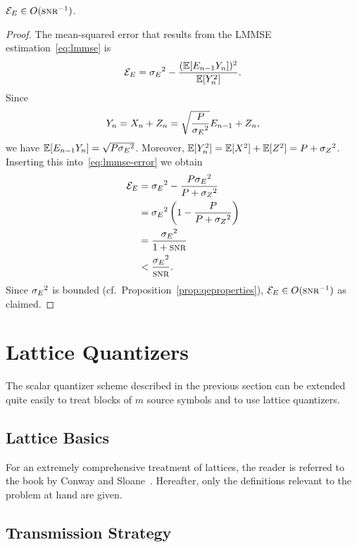\begin{lemma}
  \label{lem:eedecay}
  $\Ee \in O(\snr^{-1})$. 
\end{lemma}
\begin{proof}
  The mean-squared error that results from the LMMSE estimation~\eqref{eq:lmmse}
  is
  \begin{equation}
    \label{eq:lmmse-error}
    {{\mathcal{E}}_E} = {{\sigma_E}^2} - \frac{(\mathbb{E}[E_{n-1}
    Y_n])^2}{\mathbb{E}[Y_n^2]}. 
  \end{equation}
  Since
  \begin{equation*}
    Y_n = X_n + Z_n = \sqrt{\frac{P}{{{\sigma_E}^2}}} E_{n-1} + Z_n,
  \end{equation*}
  we have $\mathbb{E}[E_{n-1}Y_n] = \sqrt{P{{\sigma_E}^2}}$. Moreover, $\mathbb{E}[Y_n^2] = \mathbb{E}[X^2] +
  \mathbb{E}[Z^2] = P+{{\sigma_Z}^2}$.  Inserting this into~\eqref{eq:lmmse-error} we obtain
  \begin{align*}
    \Ee &= \seq - \frac{P \seq}{P + \szq} \\
    &= \seq \left( 1 - \frac{P}{P + \szq} \right) \\
    &= \frac{\seq}{1 + \snr} \\
    & < \frac{\seq}{\snr}.
  \end{align*}
  Since ${{\sigma_E}^2}$ is bounded (cf.\ Proposition~\ref{prop:qeproperties}), 
  $\Ee \in O(\snr^{-1})$ as claimed.

\end{proof}



\section{Lattice Quantizers}\label{sec:latticequant}

The scalar quantizer scheme described in the previous section can be extended
quite easily to treat blocks of $m$ source symbols and to use lattice
quantizers. 


\subsection{Lattice Basics}

For an extremely comprehensive treatment of lattices, the reader is referred to
the book by Conway and Sloane~\cite{ConwayS1988}. Hereafter, only the
definitions relevant to the problem at hand are given.



\subsection{Transmission Strategy}

